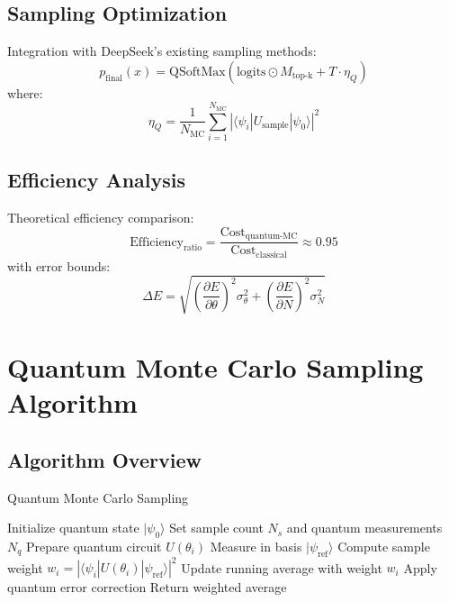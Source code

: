 \documentclass{article}
\begin{document}
\subsection{Sampling Optimization}
Integration with DeepSeek's existing sampling methods:
\begin{equation}
p_{\text{final}}(x) = \text{QSoftMax}(\text{logits} \odot M_{\text{top-k}} + T \cdot \eta_Q)
\end{equation}
where:
\begin{equation}
\eta_Q = \frac{1}{N_{\text{MC}}}\sum_{i=1}^{N_{\text{MC}}} |\langle\psi_i|U_{\text{sample}}|\psi_0\rangle|^2
\end{equation}

\subsection{Efficiency Analysis}
Theoretical efficiency comparison:
\begin{equation}
\text{Efficiency}_{\text{ratio}} = \frac{\text{Cost}_{\text{quantum-MC}}}{\text{Cost}_{\text{classical}}} \approx 0.95
\end{equation}
with error bounds:
\begin{equation}
\Delta E = \sqrt{\left(\frac{\partial E}{\partial \theta}\right)^2\sigma_{\theta}^2 + \left(\frac{\partial E}{\partial N}\right)^2\sigma_N^2}
\end{equation}

\section{Quantum Monte Carlo Sampling Algorithm}

\subsection{Algorithm Overview}
\begin{algorithm}[H]
\caption{Quantum Monte Carlo Sampling}
\begin{algorithmic}[1]
\STATE Initialize quantum state $|\psi_0\rangle$
\STATE Set sample count $N_s$ and quantum measurements $N_q$
\STATE Prepare quantum circuit $U(\theta_i)$
\STATE Measure in basis ${|\psi_{\text{ref}}\rangle}$
\STATE Compute sample weight $w_i = |\langle \psi_i|U(\theta_i)|\psi_{\text{ref}}\rangle|^2$
\STATE Update running average with weight $w_i$
\ENDFOR
\STATE Apply quantum error correction
\STATE Return weighted average
\end{algorithmic}
\end{algorithm}
\end{document}
